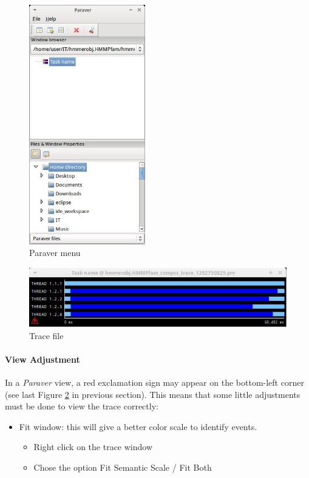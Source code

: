 \begin{figure}[ht!]
  \centering
    \includegraphics[width=0.45\textwidth]{./Sections/4_Tools/Figures/1.jpeg}
    \caption{Paraver menu}
    \label{fig:trace_1}
\end{figure}

\begin{figure}[ht!]
  \centering
    \includegraphics[width=1.0\textwidth]{./Sections/4_Tools/Figures/2.jpeg}
    \caption{Trace file}
    \label{fig:trace_2}
\end{figure}

\paragraph{View Adjustment}
In a \textit{Paraver} view, a red exclamation sign may appear on the bottom-left corner (see last Figure \ref{fig:trace_2} in 
previous section). This means that some little adjustments must be done to view the trace correctly:

\begin{itemize}
 \item Fit window: this will give a better color scale to identify events.
	\begin{itemize}
	    \item Right click on the trace window
	    \item Chose the option Fit Semantic Scale / Fit Both
	\end{itemize}
\end{itemize}

